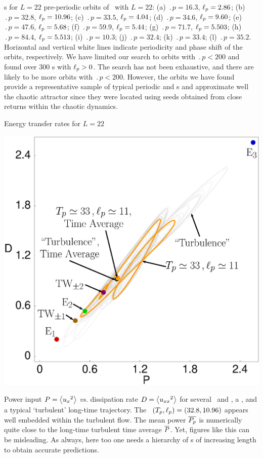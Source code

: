 \documentclass{theo1poster}[2003/04/25]
\begin{document}
\begin{poster}{3}
\begin{sheet}{\Rpo s for $L=22$}
pre-periodic
orbits of \KSe\ with $L = 22$:
(a) $\period{p} = 16.3$, $\ell_p = 2.86$;
(b) $\period{p} = 32.8$, $\ell_p = 10.96$;
(c) $\period{p} = 33.5$, $\ell_p = 4.04$;
(d) $\period{p} = 34.6$, $\ell_p = 9.60$;
(e) $\period{p} = 47.6$, $\ell_p = 5.68$;
(f) $\period{p} = 59.9$, $\ell_p = 5.44$;
(g) $\period{p} = 71.7$, $\ell_p = 5.503$;
(h) $\period{p} = 84.4$, $\ell_p = 5.513$;
(i) $\period{p} = 10.3$;
(j) $\period{p} = 32.4$;
(k) $\period{p} = 33.4$;
(l) $\period{p} = 35.2$.
Horizontal and vertical white lines indicate periodicity and phase
shift of the orbits, respectively. We have limited our search to orbits with $\period{p} < 200$ and found
over 300 \rpo s with $\ell_p > 0$.
The search has not been exhaustive, and there are likely to be more
orbits with $\period{p} < 200$. However, the orbits we have found provide a representative sample of
typical periodic and \rpo s and approximate well the chaotic
attractor since they were located using seeds obtained from close
returns within the chaotic dynamics.


\end{sheet}


\begin{sheet}{Energy transfer rates for $L=22$}

\centerline{\includegraphics[width=.4\textwidth]{../../figs/energyBalance_pst.eps}}
Power input $P = \left\langle {u_{x}{}^2} \right\rangle$ {\em vs.}
dissipation rate  $D =  \left\langle {u_{xx}{}^2} \right\rangle$
for several  \eqva\ and \reqva,
a \rpo , and a typical `turbulent' long-time trajectory.
The \rpo\ $({T_{p}},\ell_p) = (32.8,10.96)$ appears well embedded
within the turbulent flow. The mean power $\overline{P_p}$ 
is numerically quite close to the long-time
turbulent time average $\overline{P}$.
Yet, figures like this can be misleading. As always, here too one needs a hierarchy
of \po s of increasing length to obtain accurate
predictions.


\end{sheet}



\end{poster}
\end{document}
